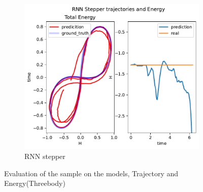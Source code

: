 \begin{figure}[H]
\begin{subfigure}[b]{0.3\textwidth}
		\centering
		\includegraphics[width=\textwidth]{chapters/chapter5/body3_rne_traj.pdf}
		\caption{RNN stepper}
	\end{subfigure}
	
	\caption{Evaluation of the sample on the models, Trajectory and Energy(Threebody)}
	\label{body3_traj}
\end{figure}

